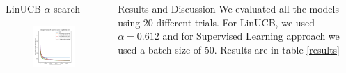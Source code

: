 \documentclass[final, 14pt]{beamer}
\newlength{\onecolwid}
\newlength{\twocolwid}
\begin{document}
\begin{frame}[t]
\begin{columns}[t]
\begin{column}{\twocolwid}
\begin{columns}[t,totalwidth=\twocolwid]
\begin{column}{\onecolwid}
\begin{block}{LinUCB $\alpha$ search}
\begin{figure}
	\includegraphics[width=\linewidth]{../plots/avg_frac_alphas.png}
\end{figure}


\end{block}


\end{column} %

\begin{column}{\onecolwid}\vspace{-.6in} %


\begin{block}{Results and Discussion}
We evaluated all the models using 20 different trials. For LinUCB, we used $\alpha = 0.612$ and for Supervised Learning approach we used a batch size of 50. Results are in table \ref{results}


\end{block}
\end{column}
\end{columns}
\end{column}
\end{columns}
\end{frame}
\end{document}
